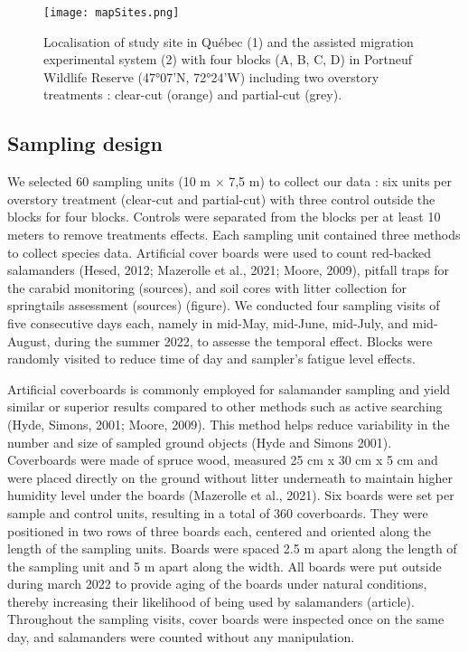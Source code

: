 \begin{figure}[ht!]
	\centering
	\texttt{[image: mapSites.png]}
	\caption[Localisation of study site in Québec, Canada.]{Localisation of study site in Québec (1) and the assisted migration experimental system (2) with four blocks (A, B, C, D) in Portneuf Wildlife Reserve (47°07'N, 72°24'W) including two overstory treatments : clear-cut (orange) and partial-cut (grey).}
	\label{fig:cartoblock}
	\end{figure}  



\subsection*{Sampling design}
\label{subsec:sampling}

We selected 60 sampling units (10 m $\times$ 7,5 m) to collect our data : six units per overstory treatment (clear-cut and partial-cut) with three control outside the blocks for four blocks.
Controls were separated from the blocks per at least 10 meters to remove treatments effects.
Each sampling unit contained three methods to collect species data. 
Artificial cover boards were used to count red-backed salamanders (Hesed, 2012; Mazerolle et al., 2021; Moore, 2009), 
pitfall traps for the carabid monitoring (sources), and soil cores with litter collection for springtails assessment (sources) (figure).
We conducted four sampling visits of five consecutive days each, namely in mid-May, mid-June, mid-July, and mid-August, during the summer 2022, to assesse the temporal effect. 
Blocks were randomly visited to reduce time of day and sampler's fatigue level effects.

Artificial coverboards is commonly employed for salamander sampling and yield similar or superior results compared to other methods such as active searching (Hyde, Simons, 2001; Moore, 2009). 
This method helps reduce variability in the number and size of sampled ground objects (Hyde and Simons 2001). 
Coverboards were made of spruce wood, measured 25 cm x 30 cm x 5 cm and were placed directly on the ground without litter underneath to maintain higher humidity level under the boards (Mazerolle et al., 2021). 
Six boards were set per sample and control units, resulting in a total of 360 coverboards.
They were positioned in two rows of three boards each, centered and oriented along the length of the sampling units.
Boards were spaced 2.5 m apart along the length of the sampling unit and 5 m apart along the width.
All boards were put outside during march 2022 to provide aging of the boards under natural conditions, thereby increasing their likelihood of being used by salamanders (article).
Throughout the sampling visits, cover boards were inspected once on the same day, and salamanders were counted without any manipulation.

